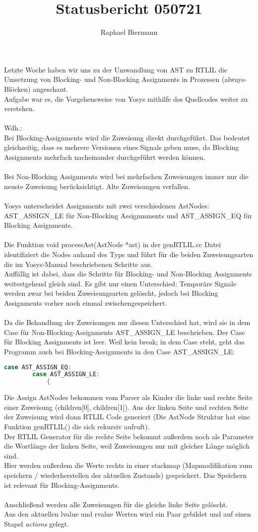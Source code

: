 \documentclass[11pt]{report}
\author{Raphael Biermann}
\title{Statusbericht 050721}
\begin{document}
Letzte Woche haben wir uns zu der Umwandlung von AST zu RTLIL die Umsetzung von Blocking- und Non-Blocking Assignments in Prozessen (always-Blöcken) angeschaut.
\\
Aufgabe war es, die Vorgehensweise von Yosys mithilfe des Quellcodes weiter zu verstehen.
\\
\\
Wdh.:\\
Bei Blocking-Assignments wird die Zuweisung direkt durchgeführt. Das bedeutet gleichzeitig, dass es mehrere Versionen eines Signals geben muss, da Blocking Assignments mehrfach nacheinander durchgeführt werden können.
\\
\\
Bei Non-Blocking Assignments wird bei mehrfachen Zuweisungen immer nur die neuste Zuweisung berücksichtigt. Alte Zuweisungen verfallen.
\\
\\
Yosys unterscheidet Assignments mit zwei verschiedenen AstNodes: AST\_ASSIGN\_LE für Non-Blocking Assignmments und AST\_ASSIGN\_EQ für Blocking Assignments.
\\
\\
Die Funktion void processAst(AstNode *ast) in der genRTLIL.cc Datei identifiziert die Nodes anhand des Typs und führt für die beiden Zuweisungsarten die im Yosys-Manual beschriebenen Schritte aus.
\\
Auffällig ist dabei, dass die Schritte für Blocking- und Non-Blocking Assignments weitestgehend gleich sind. Es gibt nur einen Unterschied: Temporäre Signale werden zwar bei beiden Zuweisungsarten gelöscht, jedoch bei Blocking Assignments vorher noch einmal zwischengespeichert.
\\
\\
Da die Behandlung der Zuweisungen nur diesen Unterschied hat, wird sie in dem Case für Non-Blocking-Assignments AST\_ASSIGN\_LE beschrieben. Der Case für Blocking Assignments ist leer. Weil kein break; in dem Case steht, geht das Programm auch bei Blocking-Assignments in den Case AST\_ASSIGN\_LE:
\begin{lstlisting}[language=C++]
case AST_ASSIGN_EQ:
		case AST_ASSIGN_LE:
			{
\end{lstlisting}
Die Assign AstNodes bekommen vom Parser als Kinder die linke und rechte Seite einer Zuweisung (children[0], children[1]).
Aus der linken Seite und rechten Seite der Zuweisung wird dann RTLIL Code generiert (Die AstNode Struktur hat eine Funktion genRTLIL() die sich rekursiv aufruft).
\\
Der RTLIL Generator für die rechte Seite bekommt außerdem noch als Parameter die Wortlänge der linken Seite, weil Zuweisungen nur mit gleicher Länge möglich sind.
\\
Hier werden außerdem die Werte rechts in einer stackmap (Mapmodifikation zum speichern / wiederherstellen des aktuellen Zustands) gespeichert. Das Speichern ist relevant für Blocking-Assignments.
\\
\\
Anschließend werden alle Zuweisungen für die gleiche linke Seite gelöscht.
\\
Aus den aktuellen lvalue und rvalue Werten wird ein Paar gebildet und auf einen Stapel \textit{actions} gelegt.
\end{document}
